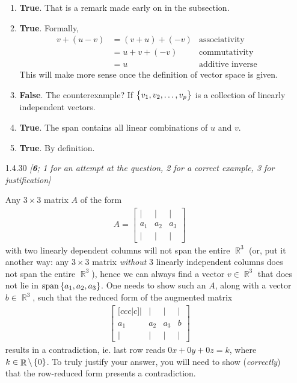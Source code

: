 \documentclass{amsart}
\theoremstyle{definition}
\theoremstyle{definition}
\DeclareMathOperator{\R}{\mathbb{R}}
\DeclareMathOperator{\1}{\mathbbm{1}}
\DeclareMathOperator{\Span}{span}
\begin{document}
\begin{enumerate}[itemsep = 2mm]
	\begin{enumerate}
		\item \textbf{True}. That is a remark made early on in the subsection.
		
		\item \textbf{True}. Formally,
		\begin{align*}
		v + (u-v) &= (v + u) + (-v) & \text{associativity}\\
		&= u +v + (-v) & \text{commutativity} \\
		&= u & \text{additive inverse}
		\end{align*}
		This will make more sense once the definition of vector space is given.
		
		\item \textbf{False}. The counterexample? If $\set{v_1,v_2,\dots,v_p}$ is a collection of linearly independent vectors.
		
		\item \textbf{True}. The span contains all linear combinations of $u$ and $v$.
		
		\item \textbf{True}. By definition.
	\end{enumerate}
	
	
	
	
	\item[1.4.30] \textit{[\textbf{6}; 1 for an attempt at the question, 2 for a correct example, 3 for justification]}
	
	Any $3 \times 3 $ matrix $A$ of the form
	\begin{align*}
	A = \begin{bmatrix}
	| & | & | \\
	a_1 & a_2 & a_3 \\
	| & | & | 
	\end{bmatrix}
	\end{align*}
	with two linearly dependent columns will not span the entire $\R^3$ (or, put it another way: any $3 \times 3 $ matrix \textit{without} 3 linearly independent columns does not span the entire $\R^3$), hence we can always find a vector $v \in \R^3$ that does not lie in $\Span \set{a_1,a_2,a_3}$. One needs to show such an $A$, along with a vector $b \in \R^3$, such that the reduced form of the augmented matrix
	\begin{align*}
	\begin{bmatrix}[ccc|c]
	| & | & | & |\\
	a_1 & a_2 & a_3  & b \\
	| & | & |  & |
	\end{bmatrix}
	\end{align*}
	results in a contradiction, ie. last row reads $0x+0y+0z = k$, where $k \in \R \setminus \set{0}$. To truly justify your answer, you will need to show (\textit{correctly}) that the row-reduced form presents a contradiction.
	

\end{enumerate}
\end{document}
